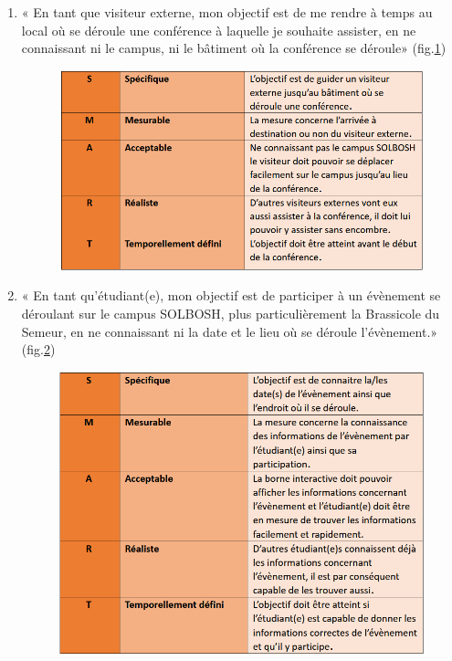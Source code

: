 \begin{enumerate}
    \item « En tant que visiteur externe, mon objectif est de me rendre à temps au local où se déroule une conférence à laquelle je souhaite assister, en ne connaissant ni le campus, ni le bâtiment où la conférence se déroule» (fig.\ref{smart2})
    \begin{figure} [h]
        \label{smart2} \caption{}
        \centering
        \includegraphics[width=13cm]{Pictures/smart2.png}
    \end{figure}
    \item « En tant qu’étudiant(e), mon objectif est de participer à un évènement se déroulant sur le campus SOLBOSH, plus particulièrement la Brassicole du Semeur, en ne connaissant ni la date et le lieu où se déroule l’évènement.» (fig.\ref{smart3})
    \begin{figure} [H]
        \label{smart3} \caption{}
        \centering
        \includegraphics[width=13cm]{Pictures/smart3.png}

\end{figure}
\end{enumerate}
